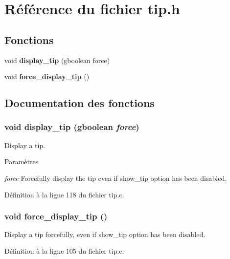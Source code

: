 \section{Référence du fichier tip.h}
\label{tip_8h}
\subsection*{Fonctions}
\begin{DoxyCompactItemize}
\item 
void {\bf display\_\-tip} (gboolean force)
\item 
void {\bf force\_\-display\_\-tip} ()
\end{DoxyCompactItemize}


\subsection{Documentation des fonctions}
\subsubsection[{display\_\-tip}]{\setlength{\rightskip}{0pt plus 5cm}void display\_\-tip (gboolean {\em force})}\label{tip_8h_a2486cf426d5d82b254fbd3caab2e253f}
Display a tip.


\begin{DoxyParams}{Paramètres}
\item[{\em force}]Forcefully display the tip even if show\_\-tip option has been disabled. \end{DoxyParams}


Définition à la ligne 118 du fichier tip.c.

\subsubsection[{force\_\-display\_\-tip}]{\setlength{\rightskip}{0pt plus 5cm}void force\_\-display\_\-tip ()}\label{tip_8h_a52290240d6d8d2a09291865bab161a6d}
Display a tip forcefully, even if show\_\-tip option has been disabled. 

Définition à la ligne 105 du fichier tip.c.

